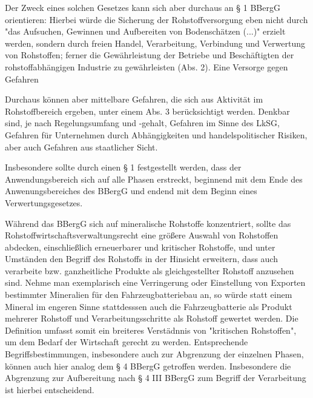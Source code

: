 \documentclass[12pt,a4paper,oneside]{book} %
\begin{document}

Der Zweck eines solchen Gesetzes kann sich aber durchaus an § 1 BBergG orientieren: Hierbei würde die Sicherung der Rohstoffversorgung eben nicht durch "das Aufsuchen, Gewinnen und Aufbereiten von Bodenschätzen (...)" erzielt werden, sondern durch freien Handel, Verarbeitung, Verbindung und Verwertung von Rohstoffen; ferner die Gewährleistung der Betriebe und Beschäftigten der rohstoffabhängigen Industrie zu gewährleisten (Abs. 2). Eine Versorge gegen Gefahren

Durchaus können aber mittelbare Gefahren, die sich aus Aktivität im Rohstoffbereich ergeben, unter einem Abs. 3 berücksichtigt werden. Denkbar sind, je nach Regelungsumfang und -gehalt, Gefahren im Sinne des LkSG, Gefahren für Unternehmen durch Abhängigkeiten und handelspolitischer Risiken, aber auch Gefahren aus staatlicher Sicht.

Insbesondere sollte durch einen § 1 festgestellt werden, dass der Anwendungsbereich sich auf alle Phasen erstreckt, beginnend mit dem Ende des Anwenungsbereiches des BBergG und endend mit dem Beginn eines Verwertungsgesetzes.

Während das BBergG sich auf mineralische Rohstoffe konzentriert, sollte das Rohstoffwirtschaftsverwaltungsrecht eine größere Auswahl von Rohstoffen abdecken, einschließlich erneuerbarer und kritischer Rohstoffe, und unter Umständen den Begriff des Rohstoffs in der Hinsicht erweitern, dass auch verarbeite bzw. ganzheitliche Produkte als gleichgestellter Rohstoff anzusehen sind. Nehme man exemplarisch eine Verringerung oder Einstellung von Exporten bestimmter Mineralien für den Fahrzeugbatteriebau an, so würde statt einem Mineral im engeren Sinne stattdesssen auch die Fahrzeugbatterie als Produkt mehrerer Rohstoff und Verarbeitungsschritte als Rohstoff gewertet werden. Die Definition umfasst somit ein breiteres Verstädnnis von "kritischen Rohstoffen", um dem Bedarf der Wirtschaft gerecht zu werden. Entsprechende Begriffsbestimmungen, insbesondere auch zur Abgrenzung der einzelnen Phasen, können auch hier analog dem § 4 BBergG getroffen werden. Insbesondere die Abgrenzung zur Aufbereitung nach § 4 III BBergG zum Begriff der Verarbeitung ist hierbei entscheidend.
\end{document}
